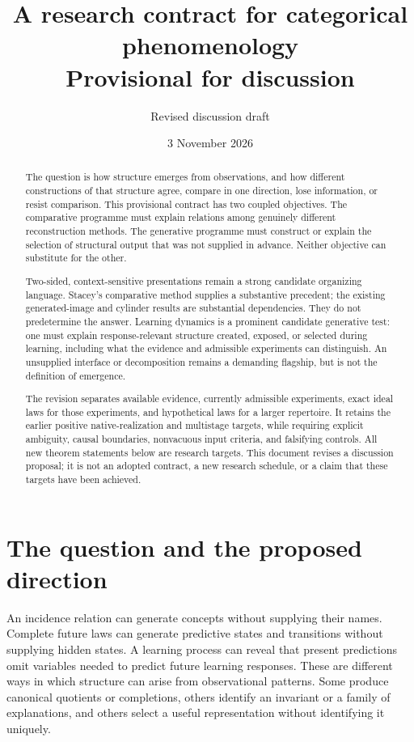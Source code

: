 \documentclass[11pt]{article}
\title{A research contract for categorical phenomenology\\\large Provisional for discussion}
\author{Revised discussion draft}
\date{3 November 2026}
\theoremstyle{remark}
\begin{document}
\maketitle
\begin{abstract}
The question is how structure emerges from observations, and how different constructions of that structure agree, compare in one direction, lose information, or resist comparison. This provisional contract has two coupled objectives. The comparative programme must explain relations among genuinely different reconstruction methods. The generative programme must construct or explain the selection of structural output that was not supplied in advance. Neither objective can substitute for the other.

Two-sided, context-sensitive presentations remain a strong candidate organizing language. Stacey's comparative method supplies a substantive precedent; the existing generated-image and cylinder results are substantial dependencies. They do not predetermine the answer. Learning dynamics is a prominent candidate generative test: one must explain response-relevant structure created, exposed, or selected during learning, including what the evidence and admissible experiments can distinguish. An unsupplied interface or decomposition remains a demanding flagship, but is not the definition of emergence.

The revision separates available evidence, currently admissible experiments, exact ideal laws for those experiments, and hypothetical laws for a larger repertoire. It retains the earlier positive native-realization and multistage targets, while requiring explicit ambiguity, causal boundaries, nonvacuous input criteria, and falsifying controls. All new theorem statements below are research targets. This document revises a discussion proposal; it is not an adopted contract, a new research schedule, or a claim that these targets have been achieved.
\end{abstract}
\tableofcontents

\section{The question and the proposed direction}
\label{sec:question}

An incidence relation can generate concepts without supplying their names. Complete future laws can generate predictive states and transitions without supplying hidden states. A learning process can reveal that present predictions omit variables needed to predict future learning responses. These are different ways in which structure can arise from observational patterns. Some produce canonical quotients or completions, others identify an invariant or a family of explanations, and others select a useful representation without identifying it uniquely.
\end{document}
